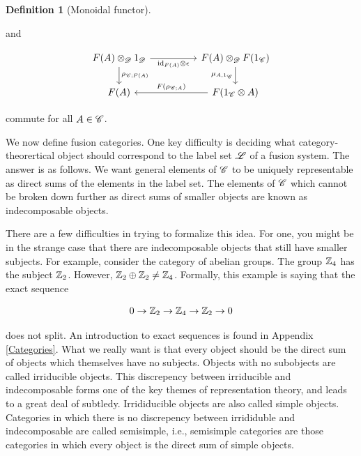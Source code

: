 \documentclass{article}
\theoremstyle{definition}
\newtheorem*{definition}{Definition}
\numberwithin{figure}{section}
\begin{document}
\begin{definition}[Monoidal functor]
\begin{enumerate}
and

\[\begin{tikzcd}
	{F(A)\otimes_{\Dcat}1_{\Dcat}} && {F(A)\otimes_{\Dcat}F(1_{\Ccat})} \\
	{F(A)} && {F(1_{\Ccat}\otimes A)}
	\arrow["{\rho_{\Ccat;F(A)}}", from=1-1, to=2-1]
	\arrow["{F(\rho_{\Ccat;A})}"', from=2-3, to=2-1]
	\arrow["{\mu_{A,1_{\Ccat}}}"', from=1-3, to=2-3]
	\arrow["{\id_{F(A)}\otimes\epsilon}"', from=1-1, to=1-3]
\end{tikzcd}\]

commute for all $A\in \mathscr{C}$.
\end{enumerate}

\raggedleft\qedsymbol{}
\end{definition}

We now define fusion categories. One key difficulty is deciding what category-theorertical object should correspond to the label set $\mathscr{L}$ of a fusion system. The answer is as follows. We want general elements of $\mathscr{C}$ to be uniquely representable as direct sums of the elements in the label set. The elements of $\mathscr{C}$ which cannot be broken down further as direct sums of smaller objects are known as indecomposable objects.

There are a few difficulties in trying to formalize this idea. For one, you might be in the strange case that there are indecomposable objects that still have smaller subjects. For example, consider the category of abelian groups. The group $\mathbb{Z}_4$ has the subject $\mathbb{Z}_2$. However, $\mathbb{Z}_2\oplus\mathbb{Z}_2\neq \mathbb{Z}_4$. Formally, this example is saying that the exact sequence

$$0\to \mathbb{Z}_2\to \mathbb{Z}_4\to\mathbb{Z}_2\to 0$$

does not split. An introduction to exact sequences is found in Appendix \ref{Categories}. What we really want is that every object should be the direct sum of objects which themselves have no subjects. Objects with no subobjects are called irriducible objects. This discrepency between irriducible and indecomposable forms one of the key themes of representation theory, and leads to a great deal of subtledy. Irrididucible objects are also called simple objects. Categories in which there is no discrepency between irrididuble and indecomposable are called semisimple, i.e., semisimple categories are those categories in which every object is the direct sum of simple objects.
\end{document}
